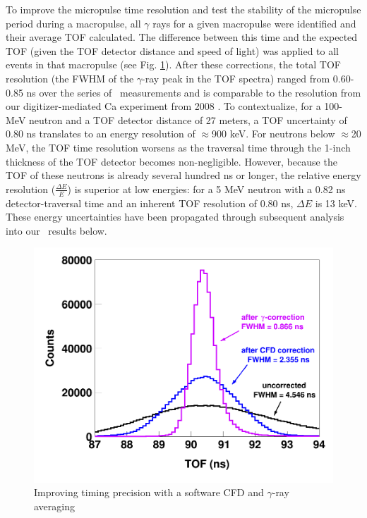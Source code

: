 To improve the micropulse time resolution and test the stability of the
micropulse period during a macropulse, all $\gamma$ rays for a given macropulse
were identified and their average TOF calculated. The difference between this
time and the expected TOF (given the TOF detector distance and speed of light)
was applied to all events in that macropulse (see Fig.
\ref{TimingCorrectionStudy}). After these corrections, the total TOF resolution
(the FWHM of the $\gamma$-ray peak in the TOF spectra) ranged from
0.60-0.85 ns over the series of \tot\ measurements and is comparable to the resolution from 
our digitizer-mediated Ca experiment from 2008 \cite{Shane2010}.
To contextualize, for a 100-MeV neutron and a TOF detector distance of 27 meters, a TOF 
uncertainty of 0.80 ns translates to an energy resolution of $\approx$900 keV.
For neutrons below $\approx$20 MeV, the TOF time resolution worsens as the traversal time 
through the 1-inch thickness of the TOF detector becomes non-negligible.
However, because the TOF of these neutrons is already several hundred ns or
longer, the relative energy resolution ($\frac{\Delta E}{E}$) is
superior at low energies: for a 5 MeV neutron with a 0.82 ns detector-traversal time and
an inherent TOF resolution of 0.80 ns, $\Delta E$ is 13 keV. These energy uncertainties
have been propagated through subsequent analysis into our \tot\ results below.

\begin{figure}
    \includegraphics[scale=0.24]{figures/TimeCorrections.png}
    \caption{Improving timing precision with a software CFD and $\gamma$-ray averaging}
    \label{TimingCorrectionStudy}
\end{figure}

